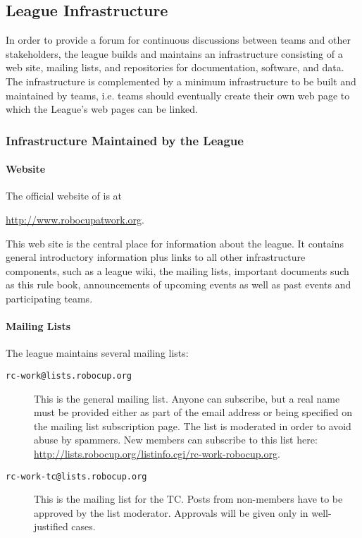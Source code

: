 \subsection{League Infrastructure}
In order to provide a forum for continuous discussions between teams and other stakeholders, the league builds and maintains an infrastructure consisting of a web site, mailing lists, and repositories for documentation, software, and data. The infrastructure is complemented by a minimum infrastructure to be built and maintained by teams, i.e. teams should eventually create their own web page to which the \RCAW League's web pages can be linked.

\subsubsection{Infrastructure Maintained by the League} \label{ssec:LeagueInfrastructure}

\paragraph{Website}
The official website of \RCAW is at
\begin{center}
\url{http://www.robocupatwork.org}.
\end{center}

This web site is the central place for information about the league. It contains general introductory information plus links to all other infrastructure components, such as a league wiki, the mailing lists, important documents such as this rule book, announcements of upcoming events as well as past events and participating teams.

\paragraph{Mailing Lists}
The league maintains several mailing lists:
\begin{description}
	\item[\texttt{rc-work@lists.robocup.org}] This is the general \RCAW mailing list. Anyone can subscribe, but a real name must be provided either as part of the email address or being specified on the mailing list subscription page. The list is moderated in order to avoid abuse by spammers. New members can subscribe to this list here: \url{http://lists.robocup.org/listinfo.cgi/rc-work-robocup.org}.

	\item[\texttt{rc-work-tc@lists.robocup.org}] This is the mailing list for the TC. Posts from non-members have to be approved by the list moderator. Approvals will be given only in well-justified cases.
\end{description}

